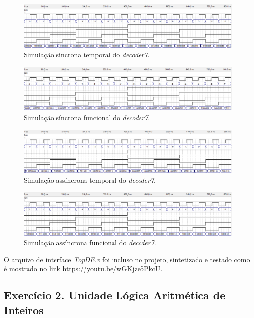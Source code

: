 \documentclass[12pt]{article}
\begin{document}
\begin{figure}[H]
	\centering
	\includegraphics[width=.8\textwidth]{ex1_st.png}
	\caption{Simulação síncrona temporal do \textit{decoder7}.}
	\label{fig:ex1st}
\end{figure}

\begin{figure}[H]
	\centering
	\includegraphics[width=.8\textwidth]{ex1_sf.png}
	\caption{Simulação síncrona funcional do \textit{decoder7}.}
	\label{fig:ex1sf}
\end{figure}

\begin{figure}[H]
	\centering
	\includegraphics[width=.8\textwidth]{ex1_ast.png}
	\caption{Simulação assíncrona temporal do \textit{decoder7}.}
	\label{fig:ex1ast}
\end{figure}

\begin{figure}[H]
	\centering
	\includegraphics[width=.8\textwidth]{ex1_asf.png}
	\caption{Simulação assíncrona funcional do \textit{decoder7}.}
	\label{fig:ex1asf}
\end{figure}

O arquivo de interface \textit{TopDE.v} foi incluso no projeto, sintetizado e testado como é mostrado no link \url{https://youtu.be/wGKjze5PkcU}.

\subsection{Exercício 2. Unidade Lógica Aritmética de Inteiros}
\label{subsec:ulaint}
\end{document}
